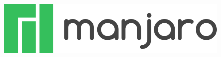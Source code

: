 \begin{figure}[ht!]
	
	\includegraphics[width=0.2\paperwidth]{./img/linux/manjaro}
\end{figure}


%
%
%
